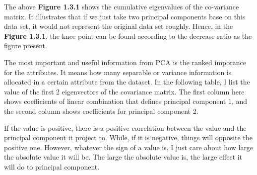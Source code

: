 \documentclass[titlepage,a4paper,12pt,thmsb]{report}
\begin{document}
\begin{center}
\begin{figure}[h]
{\par}
\end{figure}
{}
\end{center}

\newpage

The above  {\bf{Figure 1.3.1}} shows the cumulative eigenvalues of the co-variance matrix. It illustrates that if we just take two principal components base on this data set, it would not represent the original data set  roughly. Hence, in the {\bf{Figure 1.3.1}}, the knee point can be found according to the decrease ratio as the figure present.

The most important and useful information from PCA is the ranked imporance for the attributes.  It means how many separable or variance information is allocated in a certain attribute from the dataset.  In the following table, I list the value of the first 2 eigenvectors of the covariance matrix. The first column here shows coefficients of linear combination that defines principal component 1, and the second column shows coefficients for principal component 2. 

If the value is positive, there is a positive correlation between the value and the principal component it project to. While, if it is negative, things will opposite the positive one. However, whatever the sign of a value is, I just care about how large the absolute value it will be.  The large the absolute value is, the large effect it will do to principal component.
\end{document}
